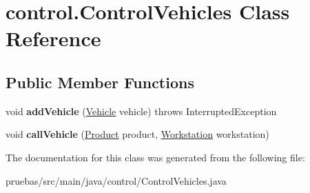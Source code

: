 \hypertarget{classcontrol_1_1_control_vehicles}{}\section{control.\+Control\+Vehicles Class Reference}
\label{classcontrol_1_1_control_vehicles}
\subsection*{Public Member Functions}
\begin{DoxyCompactItemize}
\item 
\mbox{\label{classcontrol_1_1_control_vehicles_aa17b181b16db7ce714f1970b623b91f3}} 
void {\bfseries add\+Vehicle} (\mbox{\hyperlink{classclases_1_1_vehicle}{Vehicle}} vehicle)  throws Interrupted\+Exception 
\item 
\mbox{\label{classcontrol_1_1_control_vehicles_ad7d1c177cdb8f933c3cb80adb7c56672}} 
void {\bfseries call\+Vehicle} (\mbox{\hyperlink{classclases_1_1_product}{Product}} product, \mbox{\hyperlink{classclases_1_1_workstation}{Workstation}} workstation)
\end{DoxyCompactItemize}


The documentation for this class was generated from the following file\+:\begin{DoxyCompactItemize}
\item 
pruebas/src/main/java/control/Control\+Vehicles.\+java\end{DoxyCompactItemize}
